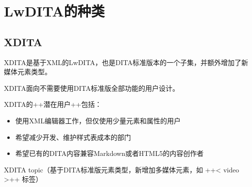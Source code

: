 \documentclass[letterpaper,10pt,english]{sphinxmanual}
\begin{document}
\chapter{LwDITA的种类}
\label{\detokenize{chap4:lwdita}}\label{\detokenize{chap4::doc}}

\section{XDITA}
\label{\detokenize{chap4:xdita}}
XDITA是基于XML的LwDITA，也是DITA标准版本的一个子集，并额外增加了新媒体元素类型。

XDITA面向不需要使用DITA标准版全部功能的用户设计。

XDITA的++潜在用户++包括：
\begin{itemize}
\item {} 
使用XML编辑器工作，但仅使用少量元素和属性的用户

\item {} 
希望减少开发、维护样式表成本的部门

\item {} 
希望已有的DITA内容兼容Markdown或者HTML5的内容创作者


\end{itemize}

XDITA topic（基于DITA标准版元素类型，新增加多媒体元素，如 ++\textless{} video \textgreater{}++ 标签）
\end{document}
